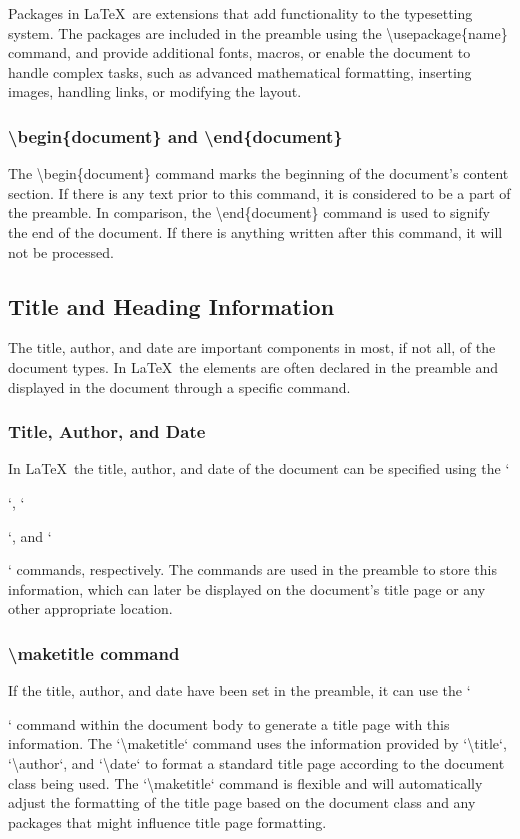 \documentclass[12pt,journal,compsoc]{IEEEtran}
\begin{document}
Packages in \LaTeX\ are extensions that add functionality to the typesetting system. The packages are included in the preamble using the \textbackslash usepackage\{name\} command, and provide additional fonts, macros, or enable the document to handle complex tasks, such as advanced mathematical formatting, inserting images, handling links, or modifying the layout. 

\subsubsection{\textbackslash begin\{document\} and \textbackslash end\{document\}}

The \textbackslash begin\{document\} command marks the beginning of the document's content section. If there is any text prior to this command, it is considered to be a part of the preamble.  In comparison, the \textbackslash end\{document\} command is used to signify the end of the document. If there is anything written after this command, it will not be processed.

\subsection{Title and Heading Information}

The title, author, and date are important components in most, if not all, of the document types. In \LaTeX\, the elements are often declared in the preamble and displayed in the document through a specific command.

\subsubsection{Title, Author, and Date}

In \LaTeX\, the title, author, and date of the document can be specified using the `\title{}`, `\author{}`, and `\date{}` commands, respectively. The commands are used in the preamble to store this information, which can later be displayed on the document's title page or any other appropriate location. 

\subsubsection{\textbackslash maketitle command}

If the title, author, and date have been set in the preamble, it can use the `\maketitle` command within the document body to generate a title page with this information. The `\textbackslash{}maketitle` command uses the information provided by `\textbackslash{}title`, `\textbackslash{}author`, and `\textbackslash{}date` to format a standard title page according to the document class being used. The `\textbackslash{}maketitle` command is flexible and will automatically adjust the formatting of the title page based on the document class and any packages that might influence title page formatting. 
\end{document}

